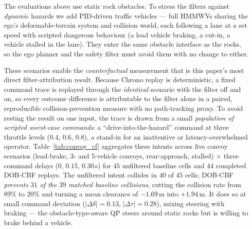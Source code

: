 \documentclass[conference,letterpaper,10pt]{IEEEtran}
\begin{document}
The evaluations above use static rock obstacles. To stress the filters
against \emph{dynamic} hazards we add PID-driven traffic vehicles --- full
HMMWVs sharing the ego's deformable-terrain system and collision world, each
following a lane at a set speed with scripted dangerous behaviour (a lead
vehicle braking, a cut-in, a vehicle stalled in the lane). They enter the same
obstacle interface as the rocks, so the ego planner and the safety filter must
avoid them with no change to either.

These scenarios enable the \emph{counterfactual} measurement that is this
paper's most direct filter-attribution result. Because Chrono replay is deterministic,
a fixed command trace is replayed through the \emph{identical}
scenario with the filter off and on, so every outcome difference is attributable
to the filter alone in a paired, reproducible collision-prevention measure
with no path-tracking proxy. To avoid resting the result on one input, the trace
is drawn from a small \emph{population of scripted worst-case commands}: a
``drive-into-the-hazard'' command at three throttle levels
($0.4$, $0.6$, $0.8$), a stand-in for an inattentive or
latency-overwhelmed operator. Table~\ref{tab:convoy_cf} aggregates these intents
across five convoy scenarios (lead-brake, 3- and 5-vehicle convoys,
rear-approach, stalled) $\times$ three command delays ($0$, $0.15$, $0.30\,$s)
for $45$ unfiltered baseline cells and $44$ completed DOB-CBF replays. The
unfiltered intent collides in $40$ of $45$ cells; DOB-CBF \emph{prevents $31$ of
the $39$ matched baseline collisions}, cutting the collision rate from $89\%$
to $20\%$ and turning a mean
clearance of $-1.69\,$m into $+1.94\,$m. It does so at small command deviation
($|\Delta\delta|=0.13$, $|\Delta\tau|=0.28$), mixing steering with braking ---
the obstacle-type-aware QP steers around static rocks but is willing to brake
behind a vehicle.
\end{document}
